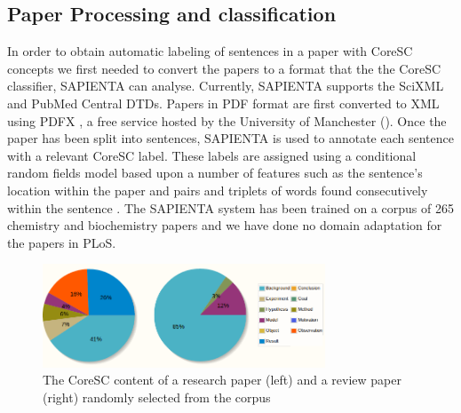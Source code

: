 \documentclass{svmult}
\begin{document}
\subsection*{Paper Processing and classification}
In order to obtain automatic labeling of sentences in a paper with
CoreSC concepts we first needed to convert the papers to a format that
the the CoreSC classifier, SAPIENTA can analyse.  Currently, SAPIENTA
supports the SciXML and PubMed Central DTDs.  Papers in PDF format are
first converted to XML using PDFX %
, a free service hosted by the University of Manchester
(\cite{Constantin2013}). Once the paper has been split into
sentences, SAPIENTA is used to annotate each sentence with a relevant
CoreSC label. These labels are assigned using a conditional random
fields model based upon a number of features such as the sentence's
location within the paper and pairs and triplets of words found
consecutively within the sentence \cite{Liakata2012}.  The SAPIENTA
system has been trained on a corpus of 265 chemistry and biochemistry
papers and we have done no domain adaptation for the papers in PLoS.



\begin{figure}[t]

\centering

\includegraphics[width=0.75\textwidth]{figures/corescs.png}
\caption{The CoreSC content of a research paper (left) and a review paper (right) randomly selected from the corpus}

\vspace{-20pt}
\label{fig:coresc_pies} 
\end{figure}

\end{document}
